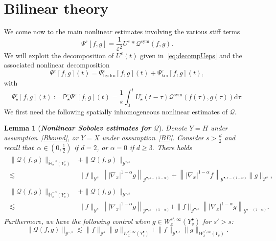 \documentclass[10pt]{amsart}
\newtheorem{lemm}[theo]{Lemma}\newtheorem{prop}[theo]{Proposition}\newtheorem{coro}[theo]{Corollary}\newtheorem{conj}[theo]{Conjecture}
\theoremstyle{definition}\newtheorem{defi}[theo]{Definition}\newtheorem{rema}[theo]{Remark}\newtheorem{exam}[theo]{Example}\newtheorem{exem}[theo]{Example}\newtheorem{nota}[theo]{Notation}
\newcommand{\hyd}{\mathrm{hydro}}
\newcommand{\kin}{\mathrm{kin}}
\newcommand{\sym}{\mathrm{sym}}
\renewcommand{\d}{\mathrm{d}}
\newcommand{\bbH}{\mathbb{H}}
\newcommand{\PP}{\mathsf{P}}
\newcommand{\QQ}{\mathcal{Q}}
\newcommand{\VV}{\mathcal{Y}}
\newcommand{\Ss}{H}
\newcommand{\Sl}{X}
\newcommand{\Sg}{Y}
\newcommand{\Sgp}{Y^{\bullet}}
\newcommand{\Sgm}{Y^{\circ}}
\newcommand{\rSSg}[1]{\VV^{#1}}
\newcommand{\rSSgp}[1]{\VV^{\bullet, #1}}
\newcommand{\rSSgm}[1]{\VV^{\circ, #1}}
\renewcommand*\ge{\geqslant}
\newcommand*\eps{{\varepsilon}}
\begin{document}
\section{Bilinear theory}\label{sec:Bilin}

We come now to the main nonlinear estimates involving the various stiff terms
\[
\Psi^\eps[f,g]=\frac{1}{\eps^2}U^\eps \ast \QQ^\sym(f,g).
\]
We will exploit the decomposition of $ U^\eps(t) $ given in~\eqref{eq:decompUeps} and the associated nonlinear decomposition
\[
\Psi^\eps[f,g](t) = \Psi^\eps_\hyd [f, g](t) + \Psi^\eps_\kin [f, g](t),
\]
with
\[
\Psi^\eps_\star [f, g](t) := \PP^\eps_\star \Psi^\eps[f,g](t) = \frac{1}{\eps} \int_0^t U^\eps_\star(t - \tau) \QQ^\sym (f(\tau), g(\tau)) \d \tau.
\]
We first need the following spatially inhomogeneous nonlinear estimates of $\QQ$.

\begin{lemm}[\emph{\textbf{Nonlinear Sobolev estimates for $\QQ$}}]\label{lem:Q_sobolev}
Denote $\Sg = \Ss$ under assumption~\eqref{Bbound}, or $\Sg = \Sl$ under assumption~\eqref{BE}. Consider $s > \frac{d}{2}$ and recall that~$\alpha \in (0, \frac{1}{2})$ if $d = 2$, or $\alpha = 0$ if $d \ge 3$. There holds
\begin{subequations}\label{eq:Q_refined_sobolev_algebra}
\begin{gather}\label{eq:Q_refined_sobolev_negative_algebra_inequality}
\begin{aligned}
\| \QQ(f, g) \|_{ \dot{\bbH}^{-\alpha}_x \left(\Sgm_v \right) } & + \| \QQ(f, g) \|_{\rSSgm{s} } \\
\lesssim& \| f \|_{ \rSSg{s} } \left\| | \nabla_x |^{1-\alpha} g \right\|_{ \rSSgp{s-(1-\alpha)} } + \left\| | \nabla_x |^{1-\alpha} f \right\|_{ \rSSgp{s-(1-\alpha)} } \| g \|_{ \rSSg{s} },
\end{aligned} \\\label{eq:Q_refined_sobolev_negative_algebra_inequality_same}
\begin{aligned}
\| \QQ(f, g) \|_{ \dot{\bbH}^{-\alpha}_x \left(\Sgm_v \right) } & + \| \QQ(f, g) \|_{\rSSgm{s} } \\
\lesssim & \| f \|_{ \rSSg{s} } \left\| | \nabla_x |^{1-\alpha} g \right\|_{ \rSSgp{s-(1-\alpha)} } + \| f \|_{ \rSSgp{s} } \left\| | \nabla_x |^{1-\alpha} g \right\|_{ \rSSg{s- (1-\alpha) } }.
\end{aligned}
\end{gather}
\end{subequations}
Furthermore, we have the following control when $g \in W^{s', \infty}_x (\Sgp_v)$ for $s' > s$:
\begin{equation}\label{eq:Q_sobolev_algebra_Holder}
\| \QQ(f, g) \|_{\rSSgm{s} } \lesssim \| f \|_{ \rSSg{s} } \| g \|_{ W^{s', \infty}_x \left(\Sgp_v \right) } + \| f \|_{ \rSSgp{s} } \| g \|_{ W^{s', \infty}_x \left(\Sg_v \right) }.
\end{equation}
\end{lemm}
\end{document}
